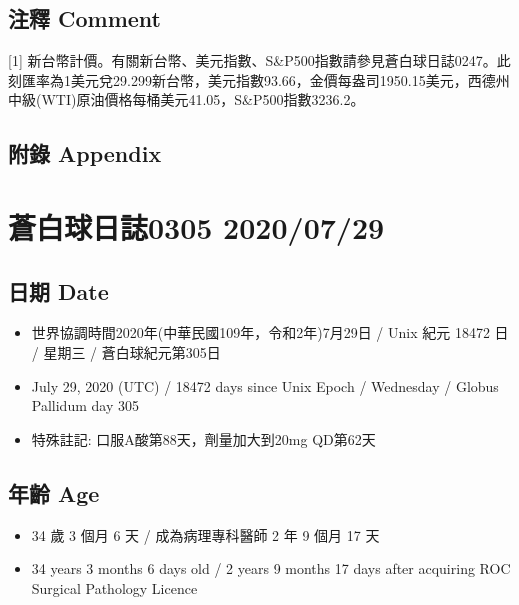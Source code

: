 \documentclass[a5paper, 11pt
]{book}
\providecommand{\tightlist}{%
  \setlength{\itemsep}{0pt}\setlength{\parskip}{0pt}}
\begin{document}
\hypertarget{ux6ce8ux91cb-comment-57}{%
\subsection{注釋 Comment}\label{ux6ce8ux91cb-comment-57}}

{[}1{]}
新台幣計價。有關新台幣、美元指數、S\&P500指數請參見蒼白球日誌0247。此刻匯率為1美元兌29.299新台幣，美元指數93.66，金價每盎司1950.15美元，西德州中級(WTI)原油價格每桶美元41.05，S\&P500指數3236.2。

\hypertarget{ux9644ux9304-appendix-57}{%
\subsection{附錄 Appendix}\label{ux9644ux9304-appendix-57}}

\hypertarget{ux84bcux767dux7403ux65e5ux8a8c0305-20200729}{%
\section{蒼白球日誌0305
2020/07/29}\label{ux84bcux767dux7403ux65e5ux8a8c0305-20200729}}

\hypertarget{ux65e5ux671f-date-58}{%
\subsection{日期 Date}\label{ux65e5ux671f-date-58}}

\begin{itemize}
\tightlist
\item
  世界協調時間2020年(中華民國109年，令和2年)7月29日 / Unix 紀元 18472 日
  / 星期三 / 蒼白球紀元第305日
\item
  July 29, 2020 (UTC) / 18472 days since Unix Epoch / Wednesday / Globus
  Pallidum day 305
\item
  特殊註記: 口服A酸第88天，劑量加大到20mg QD第62天
\end{itemize}

\hypertarget{ux5e74ux9f61-age-58}{%
\subsection{年齡 Age}\label{ux5e74ux9f61-age-58}}

\begin{itemize}
\tightlist
\item
  34 歲 3 個月 6 天 / 成為病理專科醫師 2 年 9 個月 17 天
\item
  34 years 3 months 6 days old / 2 years 9 months 17 days after
  acquiring ROC Surgical Pathology Licence
\end{itemize}
\end{document}

